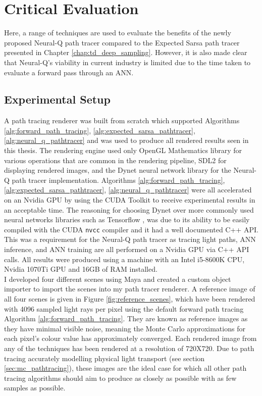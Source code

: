 \documentclass[../dissertation.tex]{subfiles}
\begin{document}
\chapter{Critical Evaluation}

\label{chap:evaluation}

Here, a range of techniques are used to evaluate the benefits of the newly proposed Neural-Q path tracer compared to the Expected Sarsa path tracer presented in Chapter \ref{chap:td_deep_sampling}. However, it is also made clear that Neural-Q's viability in current industry is limited due to the time taken to evaluate a forward pass through an ANN.

\section{Experimental Setup}

A path tracing renderer was built from scratch which supported Algorithms \ref{alg:forward_path_tracing}, \ref{alg:expected_sarsa_pathtracer}, \ref{alg:neural_q_pathtracer} and was used to produce all rendered results seen in this thesis. The rendering engine used only OpenGL Mathematics library \cite{glm} for various operations that are common in the rendering pipeline, SDL2 \cite{sdl2} for displaying rendered images, and the Dynet neural network library \cite{dynet} for the Neural-Q path tracer implementation. Algorithms \ref{alg:forward_path_tracing}, \ref{alg:expected_sarsa_pathtracer}, \ref{alg:neural_q_pathtracer} were all accelerated on an Nvidia GPU by using the CUDA Toolkit \cite{cuda} to receive experimental results in an acceptable time. The reasoning for choosing Dynet over more commonly used neural networks libraries such as Tensorflow \cite{tensorflow2015-whitepaper}, was due to its ability to be easily compiled with the CUDA \verb|nvcc| compiler and it had a well documented C++ API. This was a requirement for the Neural-Q path tracer as tracing light paths, ANN inference, and ANN training are all performed on a Nvidia GPU via C++ API calls. All results were produced using a machine with an Intel i5-8600K CPU, Nvidia 1070Ti GPU and 16GB of RAM installed.\\

I developed four different scenes using Maya \cite{maya} and created a custom object importer to import the scenes into my path tracer renderer. A reference image of all four scenes is given in Figure \ref{fig:reference_scenes}, which have been rendered with 4096 sampled light rays per pixel using the default forward path tracing Algorithm \ref{alg:forward_path_tracing}. They are known as reference images as they have minimal visible noise, meaning the Monte Carlo approximations for each pixel's colour value has approximately converged. Each rendered image from any of the techniques has been rendered at a resolution of 720X720. Due to path tracing accurately modelling physical light transport (see section \ref{sec:mc_pathtracing}), these images are the ideal case for which all other path tracing algorithms should aim to produce as closely as possible with as few samples as possible. 
\end{document}
